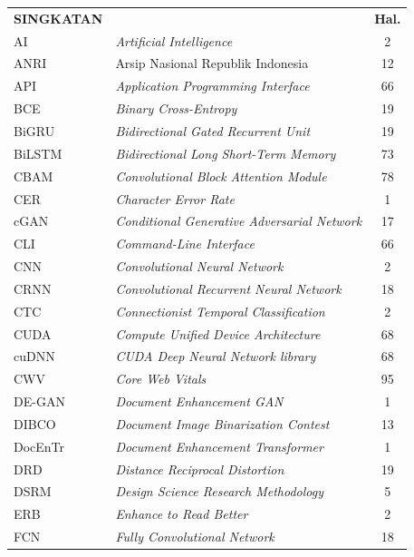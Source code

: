 \begin{longtable}{@{} l >{\raggedright\arraybackslash}p{7.5cm} c @{}}
\multicolumn{1}{c}{\textbf{SINGKATAN}} & \multicolumn{1}{c}{\textbf{Nama}} & \multicolumn{1}{c}{\textbf{Hal.}} \\


AI & \textit{Artificial Intelligence} & 2 \\
ANRI & Arsip Nasional Republik Indonesia & 12 \\
API & \textit{Application Programming Interface} & 66 \\
BCE & \textit{Binary Cross-Entropy} & 19 \\
BiGRU & \textit{Bidirectional Gated Recurrent Unit} & 19 \\
BiLSTM & \textit{Bidirectional Long Short-Term Memory} & 73 \\
CBAM & \textit{Convolutional Block Attention Module} & 78 \\
CER & \textit{Character Error Rate} & 1 \\
cGAN & \textit{Conditional Generative Adversarial Network} & 17 \\
CLI & \textit{Command-Line Interface} & 66 \\
CNN & \textit{Convolutional Neural Network} & 2 \\
CRNN & \textit{Convolutional Recurrent Neural Network} & 18 \\
CTC & \textit{Connectionist Temporal Classification} & 2 \\
CUDA & \textit{Compute Unified Device Architecture} & 68 \\
cuDNN & \textit{CUDA Deep Neural Network library} & 68 \\
CWV & \textit{Core Web Vitals} & 95 \\
DE-GAN & \textit{Document Enhancement GAN} & 1 \\
DIBCO & \textit{Document Image Binarization Contest} & 13 \\
DocEnTr & \textit{Document Enhancement Transformer} & 1 \\
DRD & \textit{Distance Reciprocal Distortion} & 19 \\
DSRM & \textit{Design Science Research Methodology} & 5 \\
ERB & \textit{Enhance to Read Better} & 2 \\
FCN & \textit{Fully Convolutional Network} & 18 \\

\end{longtable}
